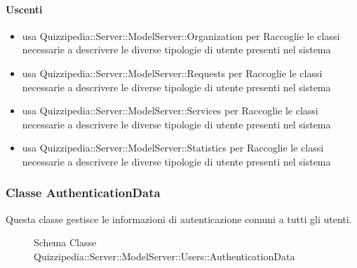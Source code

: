 \paragraph{Uscenti}
\begin{itemize}
\item usa Quizzipedia::Server::ModelServer::Organization per Raccoglie le classi necessarie a descrivere le diverse tipologie di utente presenti nel sistema
\item usa Quizzipedia::Server::ModelServer::Requests per Raccoglie le classi necessarie a descrivere le diverse tipologie di utente presenti nel sistema
\item usa Quizzipedia::Server::ModelServer::Services per Raccoglie le classi necessarie a descrivere le diverse tipologie di utente presenti nel sistema
\item usa Quizzipedia::Server::ModelServer::Statistics per Raccoglie le classi necessarie a descrivere le diverse tipologie di utente presenti nel sistema
\end{itemize}
\subsubsection{Classe AuthenticationData}
Questa classe gestisce le informazioni di autenticazione comuni a tutti gli utenti.
\begin{figure}[H]
\centering
\noindent{}
\caption[Schema Classe AuthenticationData]{Schema Classe Quizzipedia::Server::ModelServer::Users::AuthenticationData}
\end{figure}
